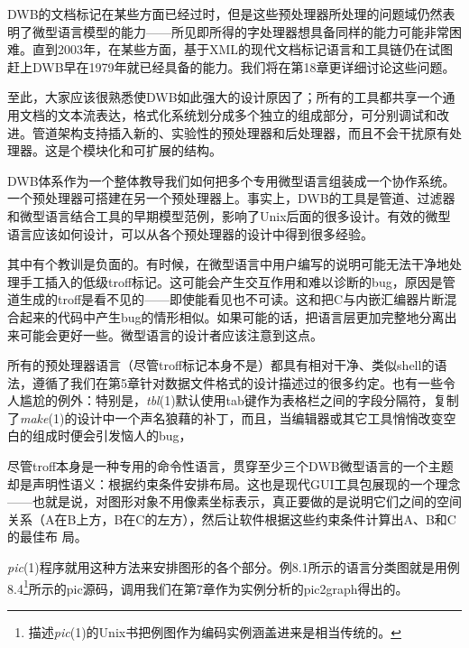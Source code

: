 \documentclass[12pt,oneside]{ctexbook}
\begin{document}
\begin{common-format}
DWB的文档标记在某些方面已经过时，但是这些预处理器所处理的问题域仍然表明了微型语言模型的能力——所见即所得的字处理器想具备同样的能力可能非常困难。直到2003年，在某些方面，基于XML的现代文档标记语言和工具链仍在试图赶上DWB早在1979年就已经具备的能力。我们将在第18章更详细讨论这些问题。

至此，大家应该很熟悉使DWB如此强大的设计原因了；所有的工具都共享一个通用文档的文本流表达，格式化系统划分成多个独立的组成部分，可分别调试和改进。管道架构支持插入新的、实验性的预处理器和后处理器，而且不会干扰原有处理器。这是个模块化和可扩展的结构。

DWB体系作为一个整体教导我们如何把多个专用微型语言组装成一个协作系统。一个预处理器可搭建在另一个预处理器上。事实上，DWB的工具是管道、过滤器和微型语言结合工具的早期模型范例，影响了Unix后面的很多设计。有效的微型语言应该如何设计，可以从各个预处理器的设计中得到很多经验。

其中有个教训是负面的。有时候，在微型语言中用户编写的说明可能无法干净地处理手工插入的低级troff标记。这可能会产生交互作用和难以诊断的bug，原因是管道生成的troff是看不见的——即使能看见也不可读。这和把C与内嵌汇编器片断混合起来的代码中产生bug的情形相似。如果可能的话，把语言层更加完整地分离出来可能会更好一些。微型语言的设计者应该注意到这点。

所有的预处理器语言（尽管troff标记本身不是）都具有相对干净、类似shell的语法，遵循了我们在第5章针对数据文件格式的设计描述过的很多约定。也有一些令人尴尬的例外：特别是，\textit{tbl}(1)默认使用tab键作为表格栏之间的字段分隔符，复制了\textit{make}(1)的设计中一个声名狼藉的补丁，而且，当编辑器或其它工具悄悄改变空白的组成时便会引发恼人的bug，

尽管troff本身是一种专用的命令性语言，贯穿至少三个DWB微型语言的一个主题却是声明性语义：根据约束条件安排布局。这也是现代GUI工具包展现的一个理念——也就是说，对图形对象不用像素坐标表示，真正要做的是说明它们之间的空间关系（A在B上方，B在C的左方），然后让软件根据这些约束条件计算出A、B和C的最佳布
局。

\textit{pic}(1)程序就用这种方法来安排图形的各个部分。例8.1所示的语言分类图就是用例8.4\footnote{描述\textit{pic}(1)的Unix书把例图作为编码实例涵盖进来是相当传统的。}所示的pic源码，调用我们在第7章作为实例分析的pic2graph得出的。


\end{common-format}
\end{document}

